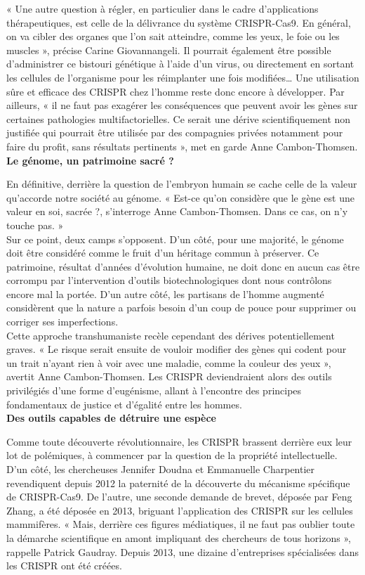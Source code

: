 \documentclass[8pt]{article}
\begin{document}
« Une autre question à régler, en particulier dans le cadre d’applications thérapeutiques, est celle de la délivrance du système CRISPR-Cas9. En général, on va cibler des organes que l’on sait atteindre, comme les yeux, le foie ou les muscles », précise Carine Giovannangeli. Il pourrait également être possible d’administrer ce bistouri génétique à l’aide d’un virus, ou directement en sortant les cellules de l’organisme pour les réimplanter une fois modifiées… Une utilisation sûre et efficace des CRISPR chez l’homme reste donc encore à développer. Par ailleurs, « il ne faut pas exagérer les conséquences que peuvent avoir les gènes sur certaines pathologies multifactorielles. Ce serait une dérive scientifiquement non justifiée qui pourrait être utilisée par des compagnies privées notamment pour faire du profit, sans résultats pertinents », met en garde Anne Cambon-Thomsen. \\

\textbf{Le génome, un patrimoine sacré ?}

En définitive, derrière la question de l’embryon humain se cache celle de la valeur qu’accorde notre société au génome. « Est-ce qu’on considère que le gène est une valeur en soi, sacrée ?, s’interroge Anne Cambon-Thomsen. Dans ce cas, on n’y touche pas. » \\

Sur ce point, deux camps s’opposent. D’un côté, pour une majorité, le génome doit être considéré comme le fruit d’un héritage commun à préserver. Ce patrimoine, résultat d’années d’évolution humaine, ne doit donc en aucun cas être corrompu par l’intervention d’outils biotechnologiques dont nous contrôlons encore mal la portée. D’un autre côté, les partisans de l’homme augmenté considèrent que la nature a parfois besoin d’un coup de pouce pour supprimer ou corriger ses imperfections. \\

Cette approche transhumaniste recèle cependant des dérives potentiellement graves. « Le risque serait ensuite de vouloir modifier des gènes qui codent pour un trait n’ayant rien à voir avec une maladie, comme la couleur des yeux », avertit Anne Cambon-Thomsen. Les CRISPR deviendraient alors des outils privilégiés d’une forme d’eugénisme, allant à l’encontre des principes fondamentaux de justice et d’égalité entre les hommes. \\

\textbf{Des outils capables de détruire une espèce}

Comme toute découverte révolutionnaire, les CRISPR brassent derrière eux leur lot de polémiques, à commencer par la question de la propriété intellectuelle. D’un côté, les chercheuses Jennifer Doudna et Emmanuelle Charpentier revendiquent depuis 2012 la paternité de la découverte du mécanisme spécifique de CRISPR-Cas9. De l’autre, une seconde demande de brevet, déposée par Feng Zhang, a été déposée en 2013, briguant l’application des CRISPR sur les cellules mammifères. « Mais, derrière ces figures médiatiques, il ne faut pas oublier toute la démarche scientifique en amont impliquant des chercheurs de tous horizons », rappelle Patrick Gaudray. Depuis 2013, une dizaine d’entreprises spécialisées dans les CRISPR ont été créées. \\
\end{document}
